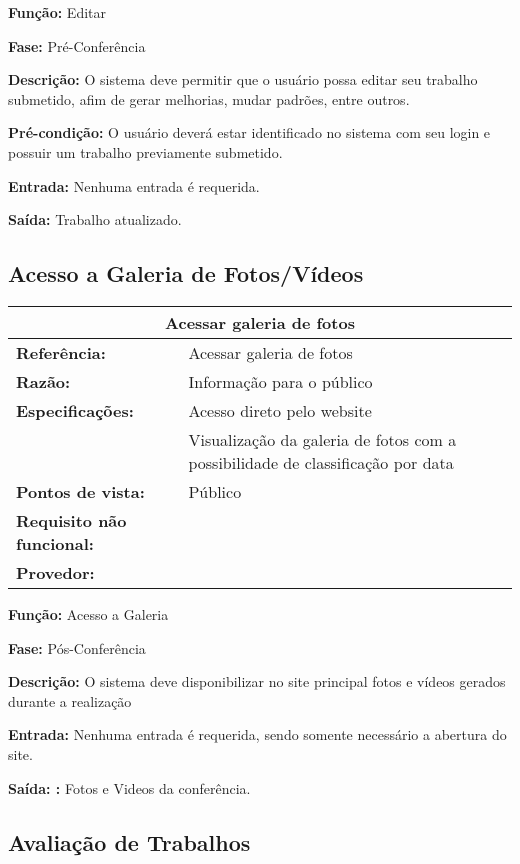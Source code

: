 \documentclass[letter]{article}
\begin{document}
\textbf{Função:}  Editar

\textbf{Fase:} Pré-Conferência

\textbf{Descrição:} O sistema deve permitir que o usuário possa editar seu trabalho submetido, afim de gerar melhorias, mudar padrões, entre outros.

\textbf{Pré-condição:}  O usuário deverá estar identificado no sistema com seu login e possuir um trabalho previamente submetido.

\textbf{Entrada:}  Nenhuma entrada é requerida.

\textbf{Saída:}  Trabalho atualizado.


\newpage
\subsection{Acesso a Galeria de Fotos/Vídeos}

%
\begin{table}[h!]\begin{center}
\begin{tabular}{|ll|}
\hline 
\multicolumn{2}{|c|}{\textbf{Acessar galeria de fotos}}\tabularnewline
\hline
\textbf{Referência:} & Acessar galeria de fotos\tabularnewline
\textbf{Razão:} & Informação para o público\tabularnewline
\textbf{Especificações:} & Acesso direto pelo website\tabularnewline
 & Visualização da galeria de fotos com a possibilidade de classificação
por data\tabularnewline
\textbf{Pontos de vista:} & Público\tabularnewline
\textbf{Requisito não funcional:} & \tabularnewline
\textbf{Provedor:} & \tabularnewline
\hline\end{tabular}\end{center}
\end{table}



\textbf{Função:} Acesso a Galeria

\textbf{Fase: } Pós-Conferência

\textbf{Descrição: } O sistema deve disponibilizar no site principal fotos e vídeos gerados durante a realização

\textbf{Entrada: } Nenhuma entrada é requerida, sendo somente necessário a abertura do site.

\textbf{Saída: :} Fotos e Videos da conferência.



\subsection{ Avaliação de Trabalhos}
\end{document}
